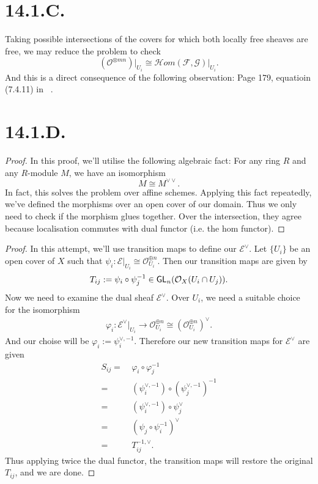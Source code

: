 \section{14.1.C.}

Taking possible intersections of the covers for which both locally free sheaves are free, we may reduce the problem to check 
\[(\mathcal O^{\otimes mn})\vert_{U_i}\cong \mathcal Hom(\mathcal F,\mathcal G)\vert_{U_i}.\]
And this is a direct consequence of the following observation:
Page 179, equatioin (7.4.11) in ~\cite{gortz2020algebraic}.

\section{14.1.D.}

\begin{proof}
    In this proof, we'll utilise the following algebraic fact: For any ring \(R\) and any \(R\)-module \(M\), we have an isomorphism
    \[M\cong M^{\vee\vee}.\]
    In fact, this solves the problem over affine schemes. Applying this fact repeatedly, we've defined the morphisms over an open cover of our domain. Thus we only need to check if the morphism glues together. Over the intersection, they agree because localisation commutes with dual functor (i.e. the hom functor).
\end{proof}

\begin{proof}
    In this attempt, we'll use transition maps to define our $\mathscr E^{\vee}$. 
    Let $\{U_i\}$ be an open cover of $X$ such that $\psi_i:\mathscr E\vert_{U_i}\cong \mathcal O^{\oplus n}_{U_i}$.
    Then our transition maps are given by 
    \begin{align*}
        T_{ij}:= \psi_i\circ \psi_j^{-1}\in \operatorname{\mathsf{GL}}_n(\mathcal O_X(U_i\cap U_j)).
    \end{align*}
    Now we need to examine the dual sheaf $\mathscr E^{\vee}$. Over $U_i$, we need a suitable choice for the isomorphism 
    \begin{align}
        \varphi_{i}:\mathscr E^{\vee}\vert_{U_i}\to \mathcal O^{\oplus n}_{U_i}\cong (\mathcal O^{\oplus n}_{U_i})^{\vee}.
    \end{align}And our choise will be $\varphi_{i}:=\psi_{i}^{\vee,-1}$.
    Therefore our new transition maps for $\mathscr E^{\vee}$ are given
    \begin{align}
        S_{ij}=&~\varphi_{i}\circ\varphi_{j}^{-1}\\
        =&~(\psi_{i}^{\vee,-1})\circ (\psi_{j}^{\vee,-1})^{-1}\\
        =&~(\psi_{i}^{\vee,-1})\circ \psi_{j}^{\vee}\\
        =&~(\psi_{j}\circ \psi_{i}^{-1})^{\vee}\\
        =&~T_{ij}^{-1,\vee}.
    \end{align}
    Thus applying twice the dual functor, the transition maps will restore the original $T_{ij}$, and we are done.
\end{proof}

